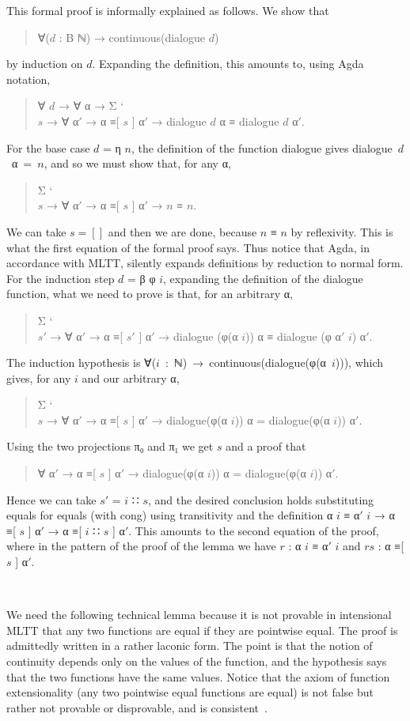 \documentclass{entcs} \usepackage{prentcsmacro}
\newcommand{\AgdaC}[1]{\mbox{#1}}
\begin{document}
\noindent This formal proof is informally explained as follows. We show that  
\begin{quote}
  ∀($d$ : B ℕ) → continuous(dialogue $d$)
\end{quote}
by induction on $d$. Expanding the definition,
this amounts to,  using Agda notation,
\begin{quote}
  ∀ $d$ → ∀ α → Σ \char`\\$s$ → ∀ α$'$ → α ≡[ $s$ ] α$'$ → dialogue $d$ α ≡ dialogue $d$ α$'$.
\end{quote}
For the base case $d$ = η $n$, the definition of the function dialogue gives \AgdaC{dialogue $d$ α = $n$}, and so we must show that, for any α, 
\begin{quote}
  Σ \char`\\$s$ → ∀ α$'$ → α ≡[ $s$ ] α$'$ → $n$ ≡ $n$.
\end{quote}
We can take $s = []$ and then we are done, because $n$ ≡ $n$ by reflexivity. 
This is what the first equation of the formal proof says. 
Thus notice that Agda, in accordance with MLTT, silently expands definitions by reduction to normal form.
For the induction step $d$ = β φ $i$, expanding the definition of the dialogue function, what we need to prove is that, for an arbitrary α, 
\begin{quote}
  Σ \char`\\$s'$ → ∀ α$'$ → α ≡[ $s'$ ] α$'$ → dialogue (φ(α $i$)) α ≡ dialogue (φ α$'$ $i$) α$'$.
\end{quote}
The induction hypothesis is \AgdaC{∀($i$ : ℕ) → continuous(dialogue(φ(α $i$)))},
which gives, for any $i$ and our arbitrary α,
\begin{quote}
Σ \char`\\$s$ → ∀ α$'$ → α ≡[ $s$ ] α$'$ → dialogue(φ(α $i$)) α = dialogue(φ(α $i$)) α$'$.
\end{quote}
Using the two projections π₀ and π₁ we get $s$ and a proof that
\begin{quote}
∀ α$'$ → α ≡[ $s$ ] α$'$ → dialogue(φ(α $i$)) α = dialogue(φ(α $i$)) α$'$.
\end{quote}
Hence we can take $s'$ = $i$ ∷ $s$, and the desired conclusion holds
substituting equals for equals (with cong) using transitivity and the
definition α $i$ ≡ α$'$ $i$ → α ≡[ $s$ ] α$'$ → α ≡[ $i$ ∷ $s$ ]
α$'$. This amounts to the second equation of the proof, where in the
pattern of the proof of the lemma we have $r$ : α $i$ ≡ α$'$ $i$ and
$rs$ : α ≡[ $s$ ] α$'$.

~

We need the following technical lemma because it is not provable in
intensional MLTT that any two functions are equal if they are
pointwise equal. The proof is admittedly written in a rather
laconic form. The point is that the notion of continuity depends only
on the values of the function, and the hypothesis says that the two
functions have the same values. Notice that the axiom of function
extensionality (any two pointwise equal functions are equal) is not
false but rather not provable or disprovable, and is consistent~\cite{HoTTbook}.
\end{document}
